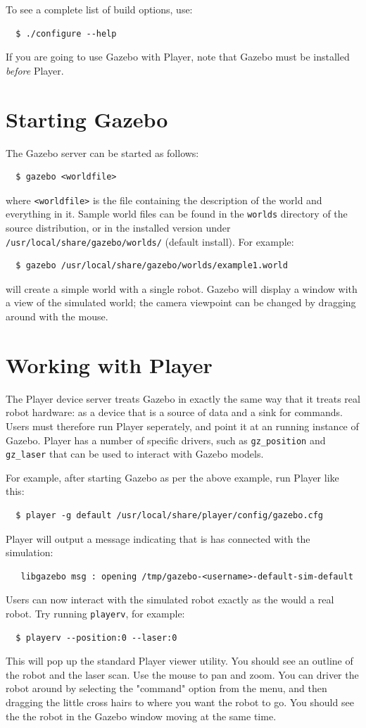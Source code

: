 \documentclass[11pt]{report}
\begin{document}
To see a complete list of build options, use:
\begin{verbatim}
  $ ./configure --help
\end{verbatim} %
If you are going to use Gazebo with Player, note that Gazebo must be
installed {\em before} Player.


\section{Starting Gazebo}

The Gazebo server can be started as follows:
\begin{verbatim}
  $ gazebo <worldfile>
\end{verbatim} %
where \verb+<worldfile>+ is the file containing the description of the
world and everything in it.  Sample world files can be found in the
{\tt worlds} directory of the source distribution, or in the
installed version under {\tt /usr/local/share/gazebo/worlds/}
(default install).  For example:
\begin{verbatim}
  $ gazebo /usr/local/share/gazebo/worlds/example1.world
\end{verbatim} %
will create a simple world with a single robot.  Gazebo will display a
window with a view of the simulated world; the camera viewpoint can be
changed by dragging around with the mouse.


\section{Working with Player}

The Player device server treats Gazebo in exactly the same way that it
treats real robot hardware: as a device that is a source of data and a
sink for commands.  Users must therefore run Player seperately, and
point it at an running instance of Gazebo.  Player has a number of
specific drivers, such as {\tt gz\_position} and {\tt gz\_laser} that
can be used to interact with Gazebo models.

For example, after starting Gazebo as per the above example, run
Player like this:
\begin{verbatim}
  $ player -g default /usr/local/share/player/config/gazebo.cfg
\end{verbatim} %
Player will output a message indicating that is has connected with the
simulation:
\begin{verbatim}  
   libgazebo msg : opening /tmp/gazebo-<username>-default-sim-default
\end{verbatim} %
Users can now interact with the simulated robot exactly as the would a
real robot.  Try running {\tt playerv}, for example:
\begin{verbatim}  
  $ playerv --position:0 --laser:0
\end{verbatim} %
This will pop up the standard Player viewer utility.  You should see
an outline of the robot and the laser scan.  Use the mouse to pan and
zoom.  You can driver the robot around by selecting the "command" option
from the menu, and then dragging the little cross hairs to where you
want the robot to go.  You should see the the robot in the Gazebo window
moving at the same time.
\end{document}
